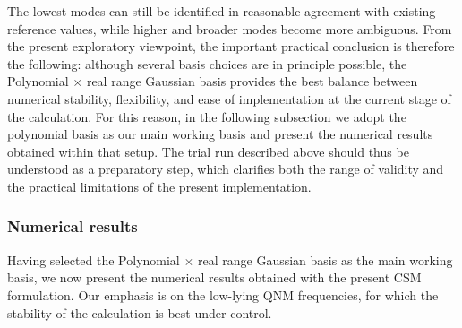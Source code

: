 The lowest modes can still be identified in reasonable agreement with existing reference values, while higher and broader modes become more ambiguous.
From the present exploratory viewpoint, the important practical conclusion is therefore the following: although several basis choices are in principle possible, the Polynomial $\times$ real range Gaussian basis provides the best balance between numerical stability, flexibility, and ease of implementation at the current stage of the calculation.
For this reason, in the following subsection we adopt the polynomial basis as our main working basis and present the numerical results obtained within that setup.
The trial run described above should thus be understood as a preparatory step, which clarifies both the range of validity and the practical limitations of the present implementation.
\subsubsection{Numerical results}
Having selected the Polynomial $\times$ real range Gaussian basis as the main working basis, we now present the numerical results obtained with the present CSM formulation.
Our emphasis is on the low-lying QNM frequencies, for which the stability of the calculation is best under control.
